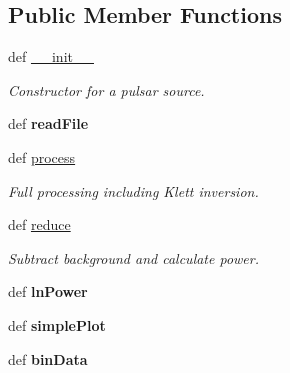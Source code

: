 \subsection*{Public Member Functions}
\begin{DoxyCompactItemize}
\item 
def \hyperlink{classpLidarRun_1_1pLidarRun_a0d0e1c5a0637af2da72909d2e2deb3bb}{\-\_\-\-\_\-init\-\_\-\-\_\-}
\begin{DoxyCompactList}\small\item\em Constructor for a pulsar source. \end{DoxyCompactList}\item 
\hypertarget{classpLidarRun_1_1pLidarRun_a9a90df9e5b521ac30f30081d91c2b21f}{def {\bfseries read\-File}}\label{classpLidarRun_1_1pLidarRun_a9a90df9e5b521ac30f30081d91c2b21f}

\item 
def \hyperlink{classpLidarRun_1_1pLidarRun_a29d4e4ec14a225f956d7a553575f9e28}{process}
\begin{DoxyCompactList}\small\item\em Full processing including Klett inversion. \end{DoxyCompactList}\item 
def \hyperlink{classpLidarRun_1_1pLidarRun_a52586e96e8c5e346460d1dc19dd30911}{reduce}
\begin{DoxyCompactList}\small\item\em Subtract background and calculate power. \end{DoxyCompactList}\item 
\hypertarget{classpLidarRun_1_1pLidarRun_aabee77680300379f1769bdd19d326e55}{def {\bfseries ln\-Power}}\label{classpLidarRun_1_1pLidarRun_aabee77680300379f1769bdd19d326e55}

\item 
\hypertarget{classpLidarRun_1_1pLidarRun_a07b9a540eee11da513c902942e0278ab}{def {\bfseries simple\-Plot}}\label{classpLidarRun_1_1pLidarRun_a07b9a540eee11da513c902942e0278ab}

\item 
\hypertarget{classpLidarRun_1_1pLidarRun_a4cebf0f7e05b5a7939ccba93b65b65ff}{def {\bfseries bin\-Data}}\label{classpLidarRun_1_1pLidarRun_a4cebf0f7e05b5a7939ccba93b65b65ff}


\end{DoxyCompactItemize}
